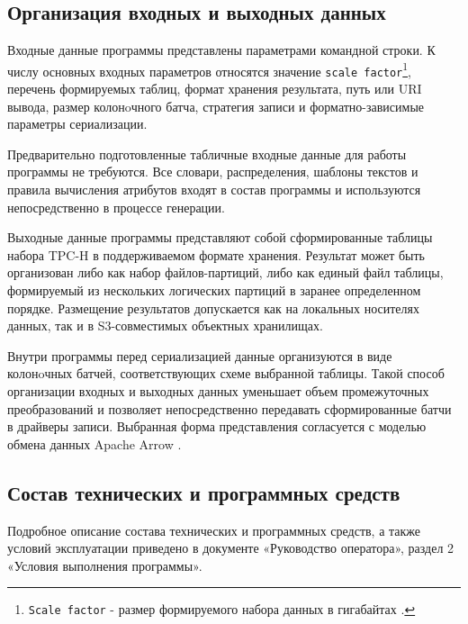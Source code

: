 \subsection{Организация входных и выходных данных}

Входные данные программы представлены параметрами командной строки. К числу
основных входных параметров относятся значение \texttt{scale
factor}\footnote{\texttt{Scale factor} - размер формируемого набора данных в
гигабайтах .}, перечень формируемых таблиц, формат хранения
результата, путь
или URI вывода, размер колонoчного батча, стратегия записи и
форматно-зависимые параметры сериализации.

Предварительно подготовленные табличные входные данные для работы программы не
требуются. Все словари, распределения, шаблоны текстов и правила вычисления
атрибутов входят в состав программы и используются непосредственно в процессе
генерации.

Выходные данные программы представляют собой сформированные таблицы набора TPC-H
в поддерживаемом формате хранения. Результат может быть организован либо как
набор файлов-партиций, либо как единый файл таблицы, формируемый из нескольких
логических партиций в заранее определенном порядке. Размещение результатов
допускается как на локальных носителях данных, так и в S3-совместимых объектных
хранилищах.

Внутри программы перед сериализацией данные организуются в виде колонoчных
батчей, соответствующих схеме выбранной таблицы. Такой способ организации
входных и выходных данных уменьшает объем промежуточных преобразований и
позволяет непосредственно передавать сформированные батчи в драйверы записи.
Выбранная форма представления согласуется с моделью обмена данных Apache Arrow
.

\subsection{Состав технических и программных средств}

Подробное описание состава технических и программных средств, а также условий
эксплуатации приведено в документе «Руководство оператора», раздел 2
«Условия выполнения программы».
